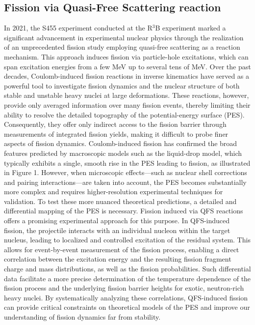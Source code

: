 \subsection{Fission via Quasi-Free Scattering reaction}
In 2021, the S455 experiment conducted at the R$^3$B experiment marked a significant advancement in experimental nuclear physics through the realization of an unprecedented fission study employing quasi-free scattering as a reaction mechanism. This approach induces fission via particle-hole excitations, which can span excitation energies from a few MeV up to several tens of MeV.\newline
Over the past decades, Coulomb-induced fission reactions in inverse kinematics have served as a powerful tool to investigate fission dynamics and the nuclear structure of both stable and unstable heavy nuclei at large deformations. These reactions, however, provide only averaged information over many fission events, thereby limiting their ability to resolve the detailed topography of the potential-energy surface (PES). Consequently, they offer only indirect access to the fission barrier through measurements of integrated fission yields, making it difficult to probe finer aspects of fission dynamics.\newline
Coulomb-induced fission has confirmed the broad features predicted by macroscopic models such as the liquid-drop model, which typically exhibits a single, smooth rise in the PES leading to fission, as illustrated in Figure 1. However, when microscopic effects—such as nuclear shell corrections and pairing interactions—are taken into account, the PES becomes substantially more complex and requires higher-resolution experimental techniques for validation.\newline
To test these more nuanced theoretical predictions, a detailed and differential mapping of the PES is necessary. Fission induced via QFS reactions offers a promising experimental approach for this purpose. In QFS-induced fission, the projectile interacts with an individual nucleon within the target nucleus, leading to localized and controlled excitation of the residual system. This allows for event-by-event measurement of the fission process, enabling a direct correlation between the excitation energy and the resulting fission fragment charge and mass distributions, as well as the fission probabilities.\newline
Such differential data facilitate a more precise determination of the temperature dependence of the fission process and the underlying fission barrier heights for exotic, neutron-rich heavy nuclei. By systematically analyzing these correlations, QFS-induced fission can provide critical constraints on theoretical models of the PES and improve our understanding of fission dynamics far from stability.


